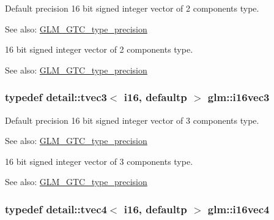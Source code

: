 Default precision 16 bit signed integer vector of 2 components type. \begin{Desc}
\item[See also:]\hyperlink{group__gtc__type__precision}{GLM\_\-GTC\_\-type\_\-precision}\end{Desc}
16 bit signed integer vector of 2 components type. \begin{Desc}
\item[See also:]\hyperlink{group__gtc__type__precision}{GLM\_\-GTC\_\-type\_\-precision} \end{Desc}
\hypertarget{group__gtc__type__precision_g22ec113d49837ef823048bb01511564c}{
\subsubsection[i16vec3]{\setlength{\rightskip}{0pt plus 5cm}typedef detail::tvec3$<$ i16, defaultp $>$ {\bf glm::i16vec3}}}
\label{group__gtc__type__precision_g22ec113d49837ef823048bb01511564c}


Default precision 16 bit signed integer vector of 3 components type. \begin{Desc}
\item[See also:]\hyperlink{group__gtc__type__precision}{GLM\_\-GTC\_\-type\_\-precision}\end{Desc}
16 bit signed integer vector of 3 components type. \begin{Desc}
\item[See also:]\hyperlink{group__gtc__type__precision}{GLM\_\-GTC\_\-type\_\-precision} \end{Desc}
\hypertarget{group__gtc__type__precision_g28cd96ac55e2209bdbd3a41cb8af970a}{
\subsubsection[i16vec4]{\setlength{\rightskip}{0pt plus 5cm}typedef detail::tvec4$<$ i16, defaultp $>$ {\bf glm::i16vec4}}}
\label{group__gtc__type__precision_g28cd96ac55e2209bdbd3a41cb8af970a}


